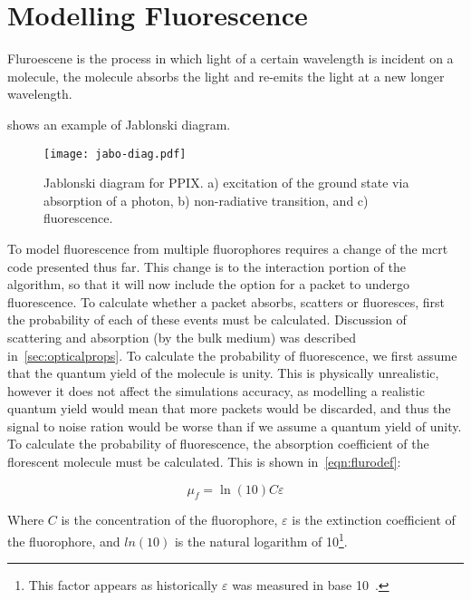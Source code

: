 

\section{Modelling Fluorescence}

Fluroescene is the process in which light of a certain wavelength is incident on a molecule, the molecule absorbs the light and re-emits the light at a new longer wavelength.

 shows an example of Jablonski diagram.

\begin{figure}[!htpb]
	\centering
	\texttt{[image: jabo-diag.pdf]}
	\caption{Jablonski diagram for PPIX. a) excitation of the ground state via absorption of a photon, b) non-radiative transition, and c) fluorescence.}
	\label{fig:Jabo}
\end{figure}

To model fluorescence from multiple fluorophores requires a change of the \gls*{mcrt} code presented thus far.
This change is to the interaction portion of the algorithm, so that it will now include the option for a packet to undergo fluorescence.
To calculate whether a packet absorbs, scatters or fluoresces, first the probability of each of these events must be calculated.
Discussion of scattering and absorption (by the bulk medium) was described in~\cref{sec:opticalprops}.
To calculate the probability of fluorescence, we first assume that the quantum yield of the molecule is unity.
This is physically unrealistic, however it does not affect the simulations accuracy, as modelling a realistic quantum yield would mean that more packets would be discarded, and thus the signal to noise ration would be worse than if we assume a quantum yield of unity.
To calculate the probability of fluorescence, the absorption coefficient of the florescent molecule must be calculated.
This is shown in~\cref{eqn:flurodef}:

\begin{equation}
\mu_f=\ln\left(10\right) C \varepsilon
\label{eqn:flurodef}
\end{equation}

Where $C$ is the concentration of the fluorophore, $\varepsilon$ is the extinction coefficient of the fluorophore, and $ln(10)$ is the natural logarithm of 10\footnote{This factor appears as historically $\varepsilon$ was measured in base 10~\cite{jacques2013optical}.}.\\


